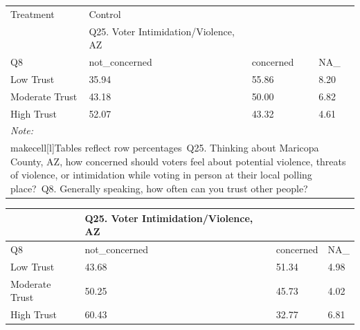 \documentclass[
  11pt,
  a4paper,
]{article}
\begin{document}
\begin{table}
\centering
\centering
\begin{tabular}[t]{l|l|l|l}
\hline
\multicolumn{1}{l|}{Treatment} & \multicolumn{1}{l}{Control} \\
\cline{1-1} \cline{2-2}
 & Q25. Voter Intimidation/Violence, AZ &  & \\
\hline
Q8 & not\_concerned & concerned & NA\_\\
\hline
Low Trust & 35.94 & 55.86 & 8.20\\
\hline
Moderate Trust & 43.18 & 50.00 & 6.82\\
\hline
High Trust & 52.07 & 43.32 & 4.61\\
\hline
\multicolumn{4}{l}{\rule{0pt}{1em}\textit{Note: }}\\
\multicolumn{4}{l}{\rule{0pt}{1em}makecell[l]{Tables reflect row percentages\ Q25. Thinking about Maricopa County, AZ, how concerned should voters feel about potential violence, threats of violence, or intimidation while voting in person at their local polling place?\ Q8. Generally speaking, how often can you trust other people?}}\\
\end{tabular}
\centering
\begin{tabular}[t]{l|l|l|l}
\hline
 & Q25. Voter Intimidation/Violence, AZ &  & \\
\hline
Q8 & not\_concerned & concerned & NA\_\\
\hline
Low Trust & 43.68 & 51.34 & 4.98\\
\hline
Moderate Trust & 50.25 & 45.73 & 4.02\\
\hline
High Trust & 60.43 & 32.77 & 6.81\\
\hline
\end{tabular}
\end{table}
\end{document}
